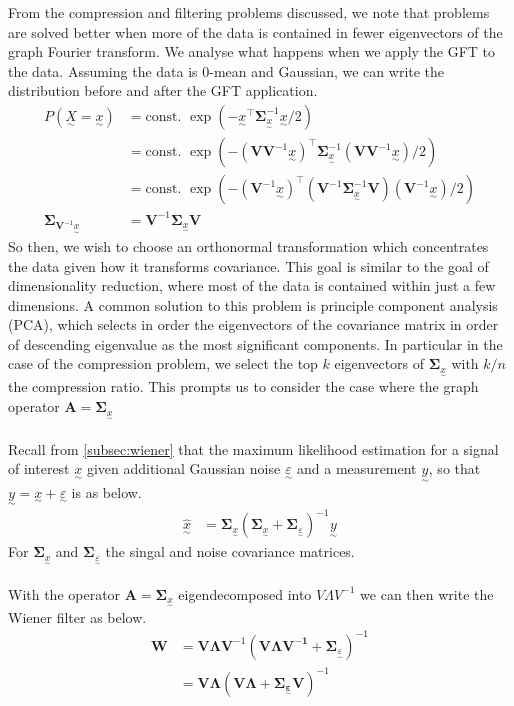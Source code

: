 \documentclass[12pt,a4paper]{article} %
\newcommand{\ve}[1]{\underset{\sim}{#1}}
\begin{document}
From the compression and filtering problems discussed, we note that problems are solved better when more of the data is contained in fewer eigenvectors of the graph Fourier transform. We analyse what happens when we apply the GFT to the data. Assuming the data is 0-mean and Gaussian, we can write the distribution before and after the GFT application.
\begin{align*}
    P(\ve{X}=\ve{x})&=\text{const. }\exp(-\ve{x}^\top \pmb{\Sigma}_{\ve{x}}^{-1} \ve{x}/2)\\
    &=\text{const. }\exp(-(\pmb{VV}^{-1}\ve{x})^\top \pmb{\Sigma}_{\ve{x}}^{-1} (\pmb{VV}^{-1}\ve{x})/2)\\
    &=\text{const. }\exp(-(\pmb{V}^{-1}\ve{x})^\top (\pmb{V}^{-1}\pmb{\Sigma}_{\ve{x}}^{-1} \pmb{V})(\pmb{V}^{-1}\ve{x})/2)\\
    \pmb{\Sigma}_{\pmb{V}^{-1}\ve{x}}&=\pmb{V}^{-1}\pmb{\Sigma}_{\ve{x}}\pmb{V}
\end{align*}
So then, we wish to choose an orthonormal transformation which concentrates the data given how it transforms covariance. This goal is similar to the goal of dimensionality reduction, where most of the data is contained within just a few dimensions. A common solution to this problem is principle component analysis (PCA), which selects in order the eigenvectors of the covariance matrix in order of descending eigenvalue as the most significant components. In particular in the case of the compression problem, we select the top $k$ eigenvectors of $\pmb{\Sigma}_{\ve{x}}$ with $k/n$ the compression ratio. This prompts us to consider the case where the graph operator $\pmb{A}=\pmb{\Sigma}_{\ve{x}}$\\\\
Recall from \ref{subsec:wiener} that the maximum likelihood estimation for a signal of interest $\ve{x}$ given additional Gaussian noise $\ve{\varepsilon}$ and a measurement $\ve{y}$, so that $\ve{y}=\ve{x}+\ve{\varepsilon}$ is as below.
\begin{align*}
    \hat{\ve{x}}&=\pmb{\Sigma}_{\ve{x}}(\pmb{\Sigma}_{\ve{x}}+\pmb{\Sigma}_{\ve{\varepsilon}})^{-1}\ve{y}
\end{align*}
For $\pmb{\Sigma}_{\ve{x}}$ and $\pmb{\Sigma}_{\ve{\varepsilon}}$ the singal and noise covariance matrices.\\\\
With the operator $\pmb{A}=\pmb{\Sigma}_{\ve{x}}$ eigendecomposed into $V\Lambda V^{-1}$ we can then write the Wiener filter as below.
\begin{align*}
    \pmb{W}&=\pmb{V\Lambda V}^{-1}(\pmb{V\Lambda V^{-1}}+\pmb{\Sigma}_{\ve{\varepsilon}})^{-1}\\
    &=\pmb{V\Lambda} (\pmb{V\Lambda} +\pmb{\Sigma_{\ve{\varepsilon}}V})^{-1}\\
\end{align*}
\end{document}
